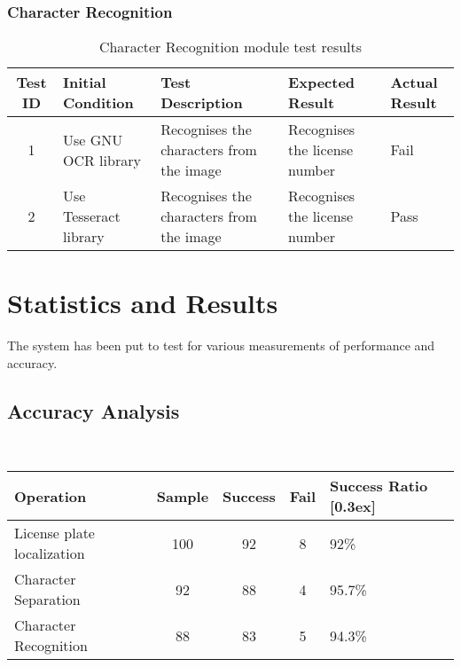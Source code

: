 \documentclass[a4paper,10pt]{iesreport}
\begin{document}
\subsubsection*{Character Recognition}
\begin{table}
\caption{Character Recognition module test results}
\begin{tabular}{c|p{3cm}|p{3.5cm}|p{3.2cm}|p{2.5cm}}
\hline
\textbf{Test ID} & \textbf{Initial Condition} & \textbf{Test Description} & \textbf{Expected Result}  & \textbf{Actual Result}\\ [0.3ex]
\hline
1 & Use GNU OCR library & Recognises the characters from the image &  Recognises the license number & Fail
\\ \hline
2 & Use Tesseract library & Recognises the characters from the image &  Recognises the license number & Pass\\
\hline
\end{tabular}
\label{table:nonlin}
\end{table}
\newpage
\section{Statistics and Results}
The system has been put to test for various measurements of performance and accuracy.
\subsection*{Accuracy Analysis} \\
\begin{table}
\begin{tabular}{p{3.5cm}|c|c|c|p{2.5cm}}
\hline
\textbf{Operation} & \textbf{Sample} & \textbf{Success} & \textbf{Fail}  & \textbf{Success Ratio} [0.3ex] \\
\hline
License plate localization & 100 & 92 &  8 & 92\% \\
\hline
Character Separation & 92 & 88 &  4 & 95.7\% \\
\hline
Character Recognition & 88 & 83 &  5 & 94.3\% \\
\hline
\end{tabular}
\label{table:nonlin}
\end{table}
\end{document}
